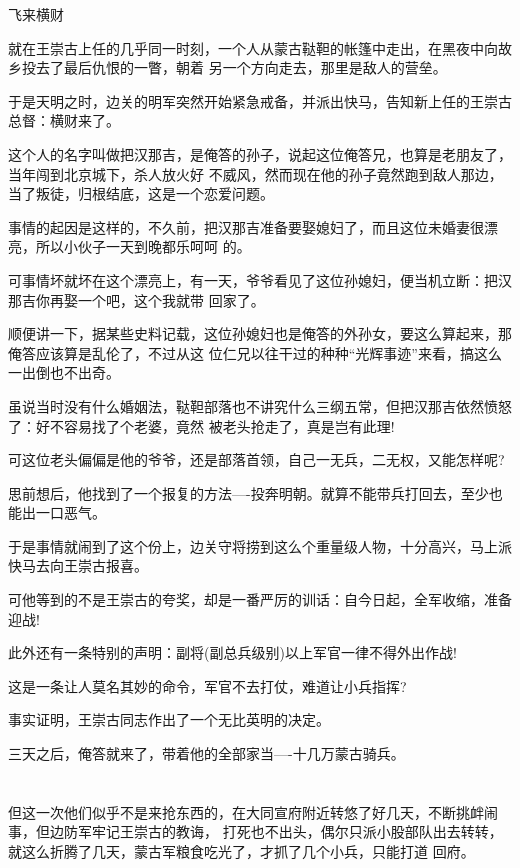 \documentclass[11pt,a4paper,onecolumn]{article}
\begin{document}
飞来横财

就在王崇古上任的几乎同一时刻，一个人从蒙古鞑靼的帐篷中走出，在黑夜中向故乡投去了最后仇恨的一瞥，朝着
另一个方向走去，那里是敌人的营垒。

于是天明之时，边关的明军突然开始紧急戒备，并派出快马，告知新上任的王崇古总督：横财来了。

这个人的名字叫做把汉那吉，是俺答的孙子，说起这位俺答兄，也算是老朋友了，当年闯到北京城下，杀人放火好
不威风，然而现在他的孙子竟然跑到敌人那边，当了叛徒，归根结底，这是一个恋爱问题。

事情的起因是这样的，不久前，把汉那吉准备要娶媳妇了，而且这位未婚妻很漂亮，所以小伙子一天到晚都乐呵呵
的。

可事情坏就坏在这个漂亮上，有一天，爷爷看见了这位孙媳妇，便当机立断：把汉那吉你再娶一个吧，这个我就带
回家了。

顺便讲一下，据某些史料记载，这位孙媳妇也是俺答的外孙女，要这么算起来，那俺答应该算是乱伦了，不过从这
位仁兄以往干过的种种``光辉事迹''来看，搞这么一出倒也不出奇。

虽说当时没有什么婚姻法，鞑靼部落也不讲究什么三纲五常，但把汉那吉依然愤怒了：好不容易找了个老婆，竟然
被老头抢走了，真是岂有此理!

可这位老头偏偏是他的爷爷，还是部落首领，自己一无兵，二无权，又能怎样呢?

思前想后，他找到了一个报复的方法----投奔明朝。就算不能带兵打回去，至少也能出一口恶气。

于是事情就闹到了这个份上，边关守将捞到这么个重量级人物，十分高兴，马上派快马去向王崇古报喜。

可他等到的不是王崇古的夸奖，却是一番严厉的训话：自今日起，全军收缩，准备迎战!

此外还有一条特别的声明：副将(副总兵级别)以上军官一律不得外出作战!

这是一条让人莫名其妙的命令，军官不去打仗，难道让小兵指挥?

事实证明，王崇古同志作出了一个无比英明的决定。

三天之后，俺答就来了，带着他的全部家当----十几万蒙古骑兵。

\section[\thesection]{}

但这一次他们似乎不是来抢东西的，在大同宣府附近转悠了好几天，不断挑衅闹事，但边防军牢记王崇古的教诲，
打死也不出头，偶尔只派小股部队出去转转，就这么折腾了几天，蒙古军粮食吃光了，才抓了几个小兵，只能打道
回府。
\end{document}

